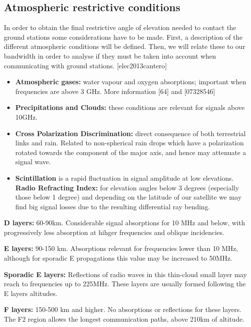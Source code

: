 \subsection{Atmospheric restrictive conditions}
In order to obtain the final restrictive angle of elevation needed to contact the ground stations some considerations have to be made. First, a description of the different atmospheric conditions will be defined. Then, we will relate these to our bandwidth in order to analyse if they must be taken into account when communicating with ground stations. [elec2013cantero]

\begin{itemize}
\item \textbf{Atmospheric gases: }water vapour and oxygen absorptions; important when frequencies are above 3 GHz. More information [64] and [07328546]
\item \textbf{Precipitations and Clouds: }these conditions are relevant for signals above 10GHz.
\item \textbf{Cross Polarization Discrimination: }direct consequence of both terrestrial links and rain. Related to non-spherical rain drops which have a polarization rotated towards the component of the major axis, and hence may attenuate a signal wave.
\item \textbf{Scintillation } is a rapid fluctuation in signal amplitude at low elevations.
\textendash\textbf{Radio Refracting Index: } for elevation angles below 3 degrees (especially those below 1 degree) and depending on the latitude of our satellite we may find big signal losses due to the resulting differential ray bending.
\end{itemize}


\textbf{D layers:} 60-90km. Considerable signal absorptions for 10 MHz and below, with progressively less absorption at hihger frequencies and oblique incidencies.

\textbf{E layers:} 90-150 km. Absorptions relevant for frequencies lower than 10 MHz, although for sporadic E propagations this value may be increased to 50MHz.

\textbf{Sporadic E layers:} Reflections of radio waves in this thin-cloud small layer may reach to frequencies up to 225MHz. These layers are usually formed following the E layers altitudes.

\textbf{F layers:} 150-500 km and higher. No absorptions or reflections for these layers. The F2 region allows the longest communication paths, above 210km of altitude.

